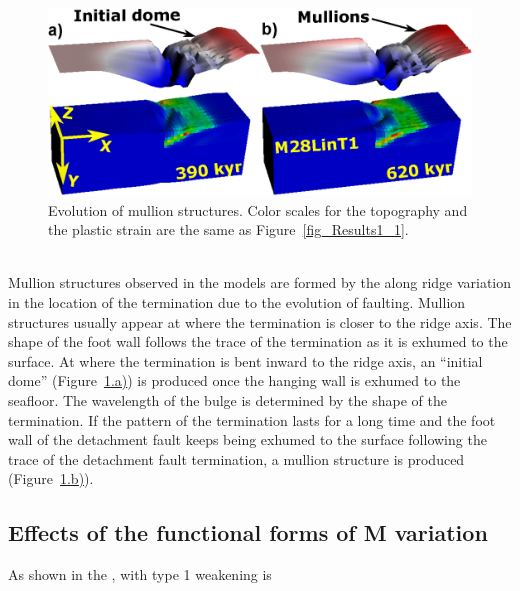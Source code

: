 \begin{figure}[h]
  \centering
    \includegraphics[width=1.0\textwidth]{./Figures/fig_Results_3_2_6_mullion_evolution.eps}
  \caption{Evolution of mullion structures. Color scales for the topography and the plastic strain are the same as Figure~\hyperref[fig_Results1_1]{\ref{fig_Results1_1}}.}
 \label{fig_Results_3_2_6_mullion_evolution}
\end{figure}
~\\
Mullion structures observed in the models are formed by the along ridge variation in the location of the termination due to the evolution of faulting. Mullion structures usually appear at where the termination is closer to the ridge axis. The shape of the foot wall follows the trace of the termination as it is exhumed to the surface. At where the termination is bent inward to the ridge axis, an ``initial dome'' (Figure~\hyperref[fig_Results_3_2_6_mullion_evolution]{\ref{fig_Results_3_2_6_mullion_evolution}.a)}) is produced once the hanging wall is exhumed to the seafloor. The wavelength of the bulge is determined by the shape of the termination. If the pattern of the termination lasts for a long time and the foot wall of the detachment fault keeps being exhumed to the surface following the trace of the detachment fault termination, a mullion structure is produced (Figure~\hyperref[fig_Results_3_2_6_mullion_evolution]{\ref{fig_Results_3_2_6_mullion_evolution}.b)}). 


\subsection{Effects of the functional forms of M variation}
As shown in the ,   with type 1 weakening is  

